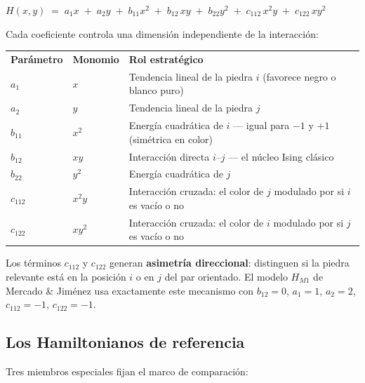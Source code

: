 \documentclass[11pt, a4paper]{article}
\newcommand{\TH}[1]{\cellcolor{cTHbg}\color{white}\textbf{#1}}
\begin{document}
\begin{tcolorbox}[codebox]
$H(x,y) \;=\; a_1 x \;+\; a_2 y \;+\; b_{11} x^2 \;+\; b_{12}\,xy
              \;+\; b_{22} y^2 \;+\; c_{112}\,x^2y \;+\; c_{122}\,xy^2$
\end{tcolorbox}

Cada coeficiente controla una dimensi\'on independiente de la interacci\'on:

\medskip
\begin{center}
\begin{tabularx}{0.96\textwidth}{C{2cm}C{2cm}X}
  \TH{Par\'ametro} & \TH{Monomio} & \TH{Rol estrat\'egico} \\[1pt]
  $a_1$     & $x$     & Tendencia lineal de la piedra $i$
                        (favorece negro o blanco puro) \\
  $a_2$     & $y$     & Tendencia lineal de la piedra $j$ \\
  $b_{11}$  & $x^2$   & Energ\'ia cuadr\'atica de $i$ ---
                        igual para $-1$ y $+1$ (sim\'etrica en color) \\
  $b_{12}$  & $xy$    & Interacci\'on directa $i$--$j$ ---
                        el n\'ucleo Ising cl\'asico \\
  $b_{22}$  & $y^2$   & Energ\'ia cuadr\'atica de $j$ \\
  $c_{112}$ & $x^2y$  & Interacci\'on cruzada: el color de $j$
                        modulado por si $i$ es vac\'io o no \\
  $c_{122}$ & $xy^2$  & Interacci\'on cruzada: el color de $i$
                        modulado por si $j$ es vac\'io o no \\
\end{tabularx}
\end{center}
\medskip

Los t\'erminos $c_{112}$ y $c_{122}$ generan \textbf{asimetr\'ia
direccional}: distinguen si la piedra relevante est\'a en la posici\'on $i$
o en $j$ del par orientado. El modelo $H_{M1}$ de Mercado \& Jim\'enez usa
exactamente este mecanismo con $b_{12}=0$, $a_1=1$, $a_2=2$,
$c_{112}=-1$, $c_{122}=-1$.

\subsection{Los Hamiltonianos de referencia}

Tres miembros especiales fijan el marco de comparaci\'on:
\end{document}
